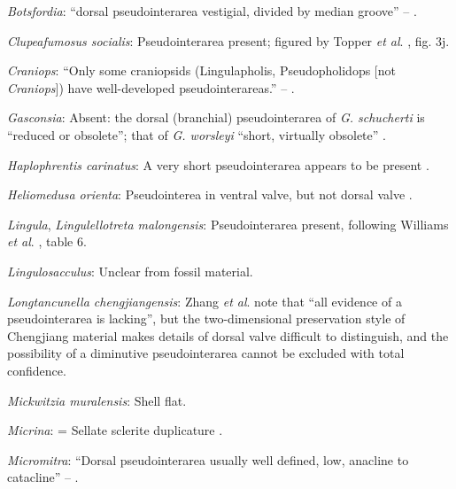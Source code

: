 \documentclass[openany]{book}
\begin{document}
\hypertarget{Botsfordia-coding-91}{}
\emph{Botsfordia}: ``dorsal pseudointerarea vestigial, divided by median
groove'' -- \citet{Williams2000LinguliformeaCraniiformea}.

\hypertarget{Clupeafumosus_socialis-coding-91}{}
\emph{Clupeafumosus socialis}: Pseudointerarea present; figured by
Topper \emph{et al}. \citeyearpar{Topper2013Reappraisalof}, fig. 3j.

\hypertarget{Craniops-coding-91}{}
\emph{Craniops}: ``Only some craniopsids (Lingulapholis, Pseudopholidops
{[}not \emph{Craniops}{]}) have well-developed pseudointerareas.'' --
\citet{Williams2000LinguliformeaCraniiformea}.

\hypertarget{Gasconsia-coding-91}{}
\emph{Gasconsia}: Absent: the dorsal (branchial) pseudointerarea of
\emph{G. schucherti} is ``reduced or obsolete''; that of \emph{G.
worsleyi} ``short, virtually obsolete'' \citep{Hanken1985Thetaxonomy}.

\hypertarget{Haplophrentis_carinatus-coding-91}{}
\emph{Haplophrentis carinatus}: A very short pseudointerarea appears to
be present \citep{Moysiuk2017Hyolithsare}.

\hypertarget{Heliomedusa_orienta-coding-91}{}
\emph{Heliomedusa orienta}: Pseudointerea in ventral valve, but not
dorsal valve \citep[2007]{Williams2000LinguliformeaCraniiformea}.

\hypertarget{Lingula-coding-91}{}
\emph{Lingula}, \emph{Lingulellotreta malongensis}: Pseudointerarea
present, following Williams \emph{et al}.
\citeyearpar{Williams2000LinguliformeaCraniiformea}, table 6.

\hypertarget{Lingulosacculus-coding-91}{}
\emph{Lingulosacculus}: Unclear from fossil material.

\hypertarget{Longtancunella_chengjiangensis-coding-91}{}
\emph{Longtancunella chengjiangensis}: Zhang \emph{et al}.
\citeyearpar{Zhang2011Theexceptionally} note that ``all evidence of a
pseudointerarea is lacking'', but the two-dimensional preservation style
of Chengjiang material makes details of dorsal valve difficult to
distinguish, and the possibility of a diminutive pseudointerarea cannot
be excluded with total confidence.

\hypertarget{Mickwitzia_muralensis-coding-91}{}
\emph{Mickwitzia muralensis}: Shell flat.

\hypertarget{Micrina-coding-91}{}
\emph{Micrina}: = Sellate sclerite duplicature
\citep{Holmer2008TheEarly}.

\hypertarget{Micromitra-coding-91}{}
\emph{Micromitra}: ``Dorsal pseudointerarea usually well defined, low,
anacline to catacline'' --
\citet{Williams2000LinguliformeaCraniiformea}.
\end{document}
